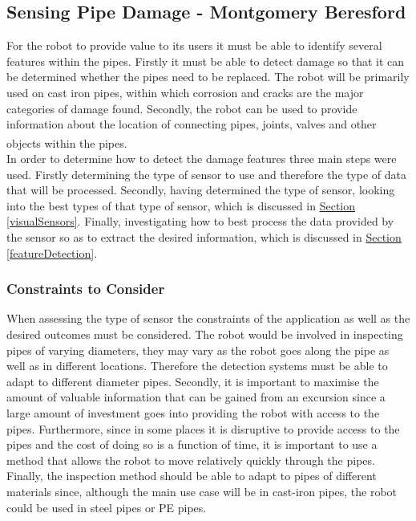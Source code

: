\documentclass[11pt]{article}		%
\newcommand{\supercite}[1]{\textsuperscript{\cite{#1}}}		%
\newcommand{\sectref}[1]{\hyperref[#1]{Section \ref*{#1}}}     %
\begin{document}
	        \subsection[Sensing Pipe Damage]{Sensing Pipe Damage - Montgomery Beresford}
	        
	        For the robot to provide value to its users it must be able to identify several features within the pipes. 
	        Firstly it must be able to detect damage so that it can be determined whether the pipes need to be replaced.
	        The robot will be primarily used on cast iron pipes, within which corrosion and cracks are the major categories of damage found.  
	        Secondly, the robot can be used to provide information about the location of connecting pipes, joints, valves and other objects within the pipes.\supercite{Failure_pipes}\supercite{Failure_pipes2}
	        \\
	        In order to determine how to detect the damage features three main steps were used. 
	        Firstly determining the type of sensor to use and therefore the type of data that will be processed. 
	        Secondly, having determined the type of sensor, looking into the best types of that type of sensor, which is discussed in \sectref{visualSensors}.
	        Finally, investigating how to best process the data provided by the sensor so as to extract the desired information, which is discussed in \sectref{featureDetection}.
	        
	        \subsubsection{Constraints to Consider}
	        
	        When assessing the type of sensor the constraints of the application as well as the desired outcomes must be considered. 
	        The robot would be involved in inspecting pipes of varying diameters, they may vary as the robot goes along the pipe as well as in different locations. 
	        Therefore the detection systems must be able to adapt to different diameter pipes. 
	        Secondly, it is important to maximise the amount of valuable information that can be gained from an excursion since a large amount of investment goes into providing the robot with access to the pipes.
	        Furthermore, since in some places it is disruptive to provide access to the pipes and the cost of doing so is a function of time, it is important to use a method that allows the robot to move relatively quickly through the pipes. 
	        Finally, the inspection method should be able to adapt to pipes of different materials since, although the main use case will be in cast-iron pipes, the robot could be used in steel pipes or PE pipes. 
	
\end{document}

